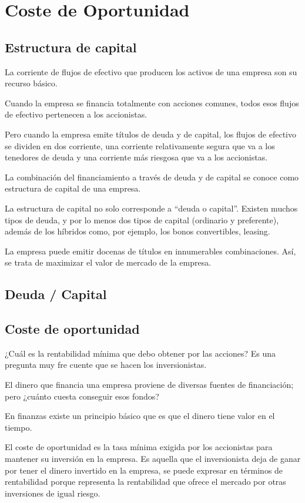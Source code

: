 \chapter{Coste de Oportunidad}
\section{Estructura de capital}
La corriente de flujos de efectivo que producen los activos de una empresa son su recurso básico.

Cuando la empresa se financia totalmente con acciones comunes, todos esos flujos de efectivo pertenecen a los accionistas.

Pero cuando la empresa emite títulos de deuda y de capital, los flujos de efectivo se dividen en dos corriente, una corriente relativamente segura que va a los tenedores de deuda y una corriente más riesgosa que va a los accionistas.

La combinación del financiamiento a través de deuda y de capital se conoce como estructura de capital de una empresa.

La estructura de capital no solo corresponde a ``deuda o capital''. Existen muchos tipos de deuda, y por lo menos dos tipos de capital (ordinario y preferente), además de los híbridos como, por ejemplo, los bonos convertibles, leasing.

La empresa puede emitir docenas de títulos en innumerables combinaciones. Así, se trata de maximizar el valor de mercado de la empresa.

\section{Deuda / Capital}

\section{Coste de oportunidad}

¿Cuál es la rentabilidad mínima que debo obtener por las acciones? Es una pregunta muy fre cuente que se hacen los inversionistas.

El dinero que financia una empresa proviene de diversas fuentes de financiación; pero ¿cuánto cuesta conseguir esos fondos?

En finanzas existe un principio básico que es que el dinero tiene valor en el tiempo.

El coste de oportunidad es la tasa mínima exigida por los accionistas para mantener su inversión en la empresa. Es aquella que el inversionista deja de ganar por tener el dinero invertido en la empresa, se puede expresar en términos de rentabilidad porque representa la rentabilidad que ofrece el mercado por otras inversiones de igual riesgo.


